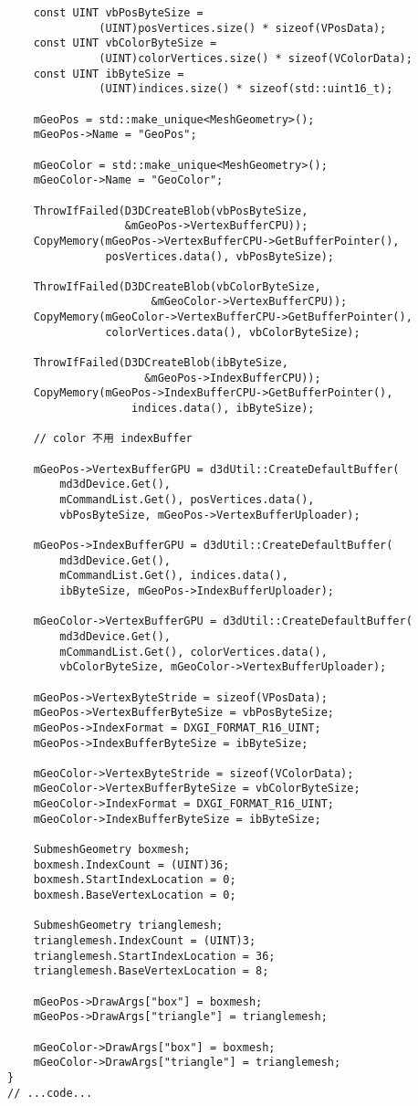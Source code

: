 \begin{lstlisting}
    const UINT vbPosByteSize = 
              (UINT)posVertices.size() * sizeof(VPosData);
    const UINT vbColorByteSize = 
              (UINT)colorVertices.size() * sizeof(VColorData);
    const UINT ibByteSize = 
              (UINT)indices.size() * sizeof(std::uint16_t);

    mGeoPos = std::make_unique<MeshGeometry>();
    mGeoPos->Name = "GeoPos";

    mGeoColor = std::make_unique<MeshGeometry>();
    mGeoColor->Name = "GeoColor";

    ThrowIfFailed(D3DCreateBlob(vbPosByteSize, 
                  &mGeoPos->VertexBufferCPU));
    CopyMemory(mGeoPos->VertexBufferCPU->GetBufferPointer(), 
               posVertices.data(), vbPosByteSize);

    ThrowIfFailed(D3DCreateBlob(vbColorByteSize, 
                      &mGeoColor->VertexBufferCPU));
    CopyMemory(mGeoColor->VertexBufferCPU->GetBufferPointer(), 
               colorVertices.data(), vbColorByteSize);

    ThrowIfFailed(D3DCreateBlob(ibByteSize, 
                     &mGeoPos->IndexBufferCPU));
    CopyMemory(mGeoPos->IndexBufferCPU->GetBufferPointer(), 
                   indices.data(), ibByteSize);

    // color 不用 indexBuffer

    mGeoPos->VertexBufferGPU = d3dUtil::CreateDefaultBuffer(
        md3dDevice.Get(),
        mCommandList.Get(), posVertices.data(), 
        vbPosByteSize, mGeoPos->VertexBufferUploader);

    mGeoPos->IndexBufferGPU = d3dUtil::CreateDefaultBuffer(
        md3dDevice.Get(),
        mCommandList.Get(), indices.data(),
        ibByteSize, mGeoPos->IndexBufferUploader);

    mGeoColor->VertexBufferGPU = d3dUtil::CreateDefaultBuffer(
        md3dDevice.Get(),
        mCommandList.Get(), colorVertices.data(),
        vbColorByteSize, mGeoColor->VertexBufferUploader);

    mGeoPos->VertexByteStride = sizeof(VPosData);
    mGeoPos->VertexBufferByteSize = vbPosByteSize;
    mGeoPos->IndexFormat = DXGI_FORMAT_R16_UINT;
    mGeoPos->IndexBufferByteSize = ibByteSize;

    mGeoColor->VertexByteStride = sizeof(VColorData);
    mGeoColor->VertexBufferByteSize = vbColorByteSize;
    mGeoColor->IndexFormat = DXGI_FORMAT_R16_UINT;
    mGeoColor->IndexBufferByteSize = ibByteSize;

    SubmeshGeometry boxmesh;
    boxmesh.IndexCount = (UINT)36;
    boxmesh.StartIndexLocation = 0;
    boxmesh.BaseVertexLocation = 0;

    SubmeshGeometry trianglemesh;
    trianglemesh.IndexCount = (UINT)3;
    trianglemesh.StartIndexLocation = 36;
    trianglemesh.BaseVertexLocation = 8;

    mGeoPos->DrawArgs["box"] = boxmesh;
    mGeoPos->DrawArgs["triangle"] = trianglemesh;

    mGeoColor->DrawArgs["box"] = boxmesh;
    mGeoColor->DrawArgs["triangle"] = trianglemesh;
}
// ...code...
\end{lstlisting}

